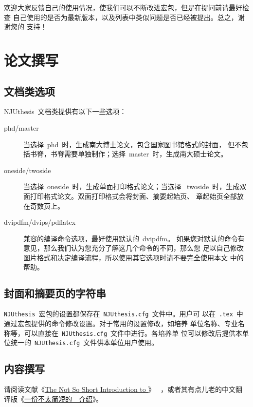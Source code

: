 \documentclass[oneside, phd]{njuthesis}
\begin{document}
欢迎大家反馈自己的使用情况，使我们可以不断改进宏包，但是在提问前请最好检查
自己使用的是否为最新版本，以及列表中类似问题是否已经被提出。总之，谢谢您的
支持！

\chapter{论文撰写}

\section{文档类选项}

NJUthesis~文档类提供有以下一些选项：

\begin{description}

\item[phd/master] 当选择~phd~时，生成南大博士论文，包含国家图书馆格式的封面，
但不包括书脊，书脊需要单独制作；选择~master~时，生成南大硕士论文。

\item[oneside/twoside] 当选择~oneside~时，生成单面打印格式论文；当选择
~twoside~时，生成双面打印格式论文。双面打印格式会将封面、摘要起始页、
章起始页全部放在奇数页上。

\item[dvipdfm/dvips/pdflatex] 兼容的编译命令选项，最好使用默认的~dvipdfm。
如果您对默认的命令有意见，那么我们认为您充分了解这几个命令的不同，那么您
足以自己修改图片格式和决定编译流程，所以使用其它选项时请不要完全使用本文
中的帮助。

\end{description}

\section{封面和摘要页的字符串}

\texttt{NJUthesis}~宏包的设置都保存在~\texttt{NJUthesis.cfg}~文件中。用户可
以在~\texttt{.tex}~中通过宏包提供的命令修改设置。对于常用的设置修改，如培养
单位名称、专业名称等，可以直接在~\texttt{NJUthesis.cfg}~文件中进行。各培养单
位可以修改后提供本单位统一的~\texttt{NJUthesis.cfg}~文件供本单位用户使用。

\section{内容撰写}

请阅读文献《\href{http://mirror.ctan.org/info/lshort/english/lshort.pdf}{The Not So Short Introduction to \LaTeXe{}}》
~\cite{Oetiker2008}，或者其有点儿老的中文翻译版《\href{http://mirror.ctan.org/info/lshort/chinese/lshort-zh-cn.pdf}{一份不太简短的~\LaTeXe{}~介绍}》\cite{lshort-cn}。
\end{document}
